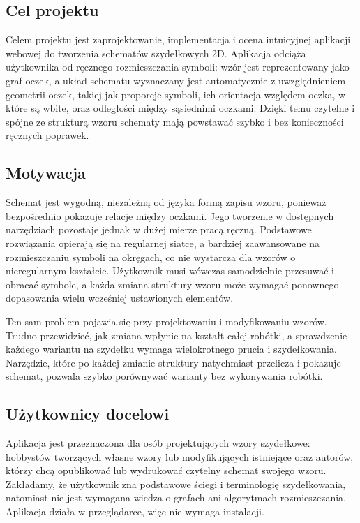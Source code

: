 \documentclass[a4paper,11pt]{article}
\begin{document}
\subsection{Cel projektu}

Celem projektu jest zaprojektowanie, implementacja i ocena intuicyjnej aplikacji webowej do tworzenia schematów szydełkowych 2D. Aplikacja odciąża użytkownika od ręcznego rozmieszczania symboli: wzór jest reprezentowany jako graf oczek, a układ schematu wyznaczany jest automatycznie z uwzględnieniem geometrii oczek, takiej jak proporcje symboli, ich orientacja względem oczka, w które są wbite, oraz odległości między sąsiednimi oczkami. Dzięki temu czytelne i spójne ze strukturą wzoru schematy mają powstawać szybko i bez konieczności ręcznych poprawek.

\subsection{Motywacja}

Schemat jest wygodną, niezależną od języka formą zapisu wzoru, ponieważ bezpośrednio pokazuje relacje między oczkami. Jego tworzenie w dostępnych narzędziach pozostaje jednak w dużej mierze pracą ręczną. Podstawowe rozwiązania opierają się na regularnej siatce, a bardziej zaawansowane na rozmieszczaniu symboli na okręgach, co nie wystarcza dla wzorów o nieregularnym kształcie. Użytkownik musi wówczas samodzielnie przesuwać i obracać symbole, a każda zmiana struktury wzoru może wymagać ponownego dopasowania wielu wcześniej ustawionych elementów.

Ten sam problem pojawia się przy projektowaniu i modyfikowaniu wzorów. Trudno przewidzieć, jak zmiana wpłynie na kształt całej robótki, a sprawdzenie każdego wariantu na szydełku wymaga wielokrotnego prucia i szydełkowania. Narzędzie, które po każdej zmianie struktury natychmiast przelicza i pokazuje schemat, pozwala szybko porównywać warianty bez wykonywania robótki.

\subsection{Użytkownicy docelowi}

Aplikacja jest przeznaczona dla osób projektujących wzory szydełkowe: hobbystów tworzących własne wzory lub modyfikujących istniejące oraz autorów, którzy chcą opublikować lub wydrukować czytelny schemat swojego wzoru. Zakładamy, że użytkownik zna podstawowe ściegi i terminologię szydełkowania, natomiast nie jest wymagana wiedza o grafach ani algorytmach rozmieszczania. Aplikacja działa w przeglądarce, więc nie wymaga instalacji.
\end{document}
